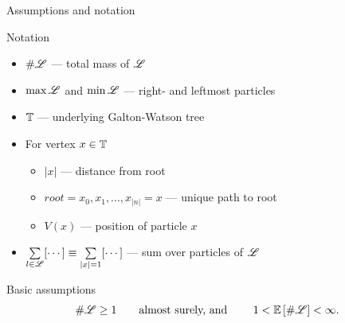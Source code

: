 \documentclass{beamer}
\begin{document}
\begin{frame}{Assumptions and notation}
\begin{block}{Notation}
\begin{itemize}
\item $\# \mathscr{L}$ --- total mass of $\mathscr{L}$
\item $\max \mathscr{L}$ and $\min \mathscr{L}$ --- right- and leftmost particles
\item $\mathbb{T}$ --- underlying Galton-Watson tree
\item For vertex $x \in \mathbb{T}$
	\begin{itemize}
		\item  $|x|$ --- distance from root
		\item $root = x_0, x_1, ..., x_{|n|} = x$ --- unique path to root
		\item $V(x)$ --- position of particle $x$ 
	\end{itemize}
\item $\sum\limits_{l \in \mathscr{L}} [\cdots] \equiv \sum\limits_{|x|=1} [\cdots]$ --- sum over particles of $\mathscr{L}$
\end{itemize}
\end{block}

\begin{block}{Basic assumptions}
\begin{equation}\nonumber
\# \mathscr{L} \geq 1 \qquad\text{almost surely, and }\qquad 1 < \mathbb{E}\left[ \# \mathscr{L} \right] < \infty. 
\end{equation}
\end{block}

\end{frame}
\end{document}
